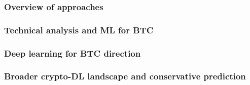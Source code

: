 \documentclass[12pt,a4paper,oneside]{article}
\begin{document}


\subsubsection{Overview of approaches}\label{subsubsec:btc_overview}



\subsubsection{Technical analysis and ML for BTC}\label{subsubsec:btc_ta}

%


\subsubsection{Deep learning for BTC direction}\label{subsubsec:btc_dl}

%


\subsubsection{Broader crypto-DL landscape and conservative prediction}\label{subsubsec:btc_dl_landscape}
\end{document}

